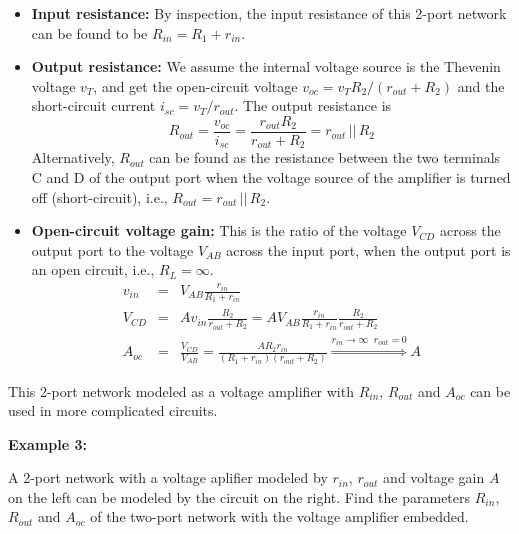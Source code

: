 \documentclass{article}
\begin{document}
\begin{itemize}
\item {\bf Input resistance:} By inspection, the input resistance of this
  2-port network can be found to be $R_{in}=R_1+r_{in}$.

\item {\bf Output resistance:} We assume the internal voltage source 
  is the Thevenin voltage $v_T$, and get the open-circuit voltage 
  $v_{oc}=v_T R_2/(r_{out}+R_2)$ and the short-circuit current
  $i_{sc}=v_T/r_{out}$. The output resistance is
  \begin{equation} 
    R_{out}=\frac{v_{oc}}{i_{sc}}=\frac{r_{out}R_2}{r_{out}+R_2}=r_{out}\,||\,R_2 
  \end{equation}
  Alternatively, $R_{out}$ can be found as the resistance between the two 
  terminals C and D of the output port when the voltage source of the amplifier 
  is turned off (short-circuit), i.e., $R_{out}=r_{out}\,||\,R_2$.

\item {\bf Open-circuit voltage gain:} This is the ratio of the voltage $V_{CD}$
  across the output port to the voltage $V_{AB}$ across the input port, when the
  output port is an open circuit, i.e., $R_L=\infty$. 
  \begin{eqnarray}
    v_{in}&=&V_{AB}\frac{r_{in}}{R_1+r_{in}}  
    \nonumber \\
    V_{CD}&=&A v_{in} \frac{R_2}{r_{out}+R_2}=A V_{AB}\frac{r_{in}}{R_1+r_{in}} 
    \frac{R_2}{r_{out}+R_2} 
    \nonumber \\
    A_{oc}&=&\frac{V_{CD}}{V_{AB}}=\frac{A R_2 r_{in}}{(R_1+r_{in})(r_{out}+R_2)} 
    \stackrel{r_{in}\rightarrow\infty\;\;r_{out}=0}{\Longrightarrow}A
  \end{eqnarray}
\end{itemize}
This 2-port network modeled as a voltage amplifier with $R_{in}$, $R_{out}$
and $A_{oc}$ can be used in more complicated circuits.

{\bf Example 3:} 

A 2-port network with a voltage aplifier modeled by $r_{in}$, $r_{out}$ and
voltage gain $A$ on the left can be modeled by the circuit on the right. 
Find the parameters $R_{in}$, $R_{out}$ and $A_{oc}$ of the two-port network 
with the voltage amplifier embedded.

\end{document}
